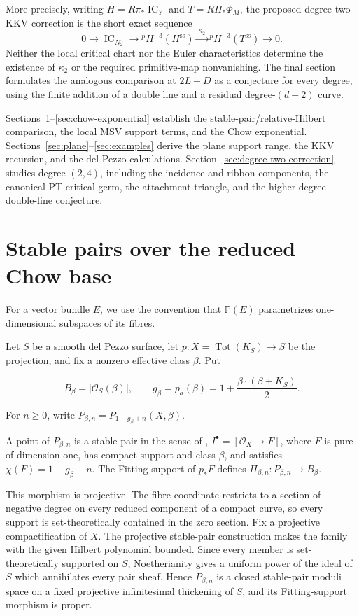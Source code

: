 \documentclass[11pt,reqno]{amsart}
\theoremstyle{definition}
\newcommand{\Pp}{\mathbb P}
\newcommand{\Ocal}{\mathcal O}
\newcommand{\IC}{\operatorname{IC}}
\newcommand{\Tot}{\operatorname{Tot}}
\begin{document}
More precisely, writing $H=R\pi_*\IC_Y$ and $T=R\Pi_*\Phi_M$, the proposed
degree-two KKV correction is the short exact sequence
\[
 0\longrightarrow\IC_{N_2}\longrightarrow{}^pH^{-3}(H^{\mathrm{ss}})
 \xrightarrow{\ \kappa_2\ }{}^pH^{-3}(T^{\mathrm{ss}})
 \longrightarrow0.
\]
Neither the local critical chart nor the Euler characteristics determine
the existence of $\kappa_2$ or the required primitive-map nonvanishing.
The final section formulates the analogous comparison at $2L+D$ as a
conjecture for every degree, using the finite addition of a double line and
a residual degree-$(d-2)$ curve.

Sections~\ref{sec:pt}--\ref{sec:chow-exponential} establish the
stable-pair/relative-Hilbert comparison, the local MSV support terms, and
the Chow exponential.  Sections~\ref{sec:plane}--\ref{sec:examples}
derive the plane support range, the KKV recursion, and the del Pezzo
calculations.  Section~\ref{sec:degree-two-correction} studies degree
$(2,4)$, including the incidence and ribbon components, the canonical PT
critical germ, the attachment triangle, and the higher-degree double-line
conjecture.

\section{Stable pairs over the reduced Chow base}\label{sec:pt}

For a vector bundle $E$, we use the convention that $\Pp(E)$ parametrizes
one-dimensional subspaces of its fibres.

Let $S$ be a smooth del Pezzo surface, let $p:X=\Tot(K_S)\to S$ be the
projection, and fix a nonzero effective class $\beta$.  Put

\[
  B_\beta=|\Ocal_S(\beta)|,
  \qquad
  g_\beta=p_a(\beta)
  =1+\frac{\beta\cdot(\beta+K_S)}2.
\]

For $n\ge0$, write $P_{\beta,n}=P_{1-g_\beta+n}(X,\beta)$.

A point of $P_{\beta,n}$ is a stable pair in the sense of \cite{PT},
$I^\bullet=[\Ocal_X\to F]$, where $F$ is pure of dimension one, has
compact support and class $\beta$, and satisfies
$\chi(F)=1-g_\beta+n$.  The Fitting support of $p_*F$ defines
$\Pi_{\beta,n}:P_{\beta,n}\to B_\beta$.

This morphism is projective.  The fibre coordinate restricts to a section
of negative degree on every reduced component of a compact curve, so every
support is set-theoretically contained in the zero section.  Fix a projective
compactification of $X$.  The projective stable-pair construction
\cite[Section~1]{PT} makes the family with the given Hilbert polynomial
bounded.  Since every member is set-theoretically supported on $S$,
Noetherianity gives a uniform power of the ideal of $S$ which annihilates
every pair sheaf.  Hence $P_{\beta,n}$ is a
closed stable-pair moduli space on a fixed projective infinitesimal
thickening of $S$, and its Fitting-support morphism is proper.
\end{document}
